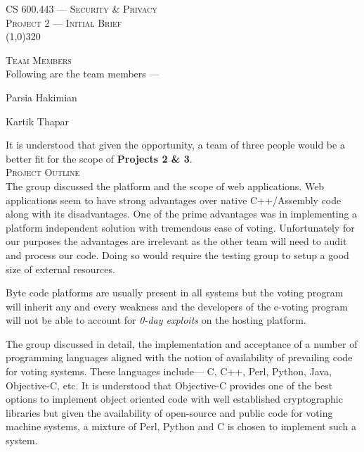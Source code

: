\documentclass[]{article}
\newcommand{\indentitem}{\setlength\itemindent{25pt}}
\begin{document}
\begin{center}
	\textsc{\LARGE CS 600.443 --- Security \& Privacy}\\[0.5cm]
	\textsc{\Large Project 2 --- Initial Brief}\\[0.25cm]
	\line(1,0){320}\\[15pt]
\end{center}


\textsc{\huge Team Members}\\

Following are the team members ---

\begin{enumerate*}
	{\indentitem \item Parsia Hakimian}
	{\indentitem \item Kartik Thapar}
\end{enumerate*}

It is understood that given the opportunity, a team of three people would be a better fit for the scope of \textbf{Projects 2 \& 3}.\\[0.5cm]

\textsc{\huge Project Outline}\\

The group discussed the platform and the scope of web applications. Web applications seem to have strong advantages over native C++/Assembly code along with its disadvantages. One of the prime advantages was in implementing a platform independent solution with tremendous ease of voting. Unfortunately for our purposes the advantages are irrelevant as the other team will need to audit and process our code. Doing so would require the testing group to setup a good size of external resources.

Byte code platforms are usually present in all systems but the voting program will inherit any and every weakness and the developers of the e-voting program will not be able to account for \emph{0-day exploits} on the hosting platform.

The group discussed in detail, the implementation and acceptance of a number of programming languages aligned with the notion of availability of prevailing code for voting systems. These languages include--- C, C++, Perl, Python, Java, Objective-C, etc. It is understood that Objective-C provides one of the best options to implement object oriented code with well established cryptographic libraries but given the availability of open-source and public code for voting machine systems, a mixture of Perl, Python and C is chosen to implement such a system.\\
\end{document}
